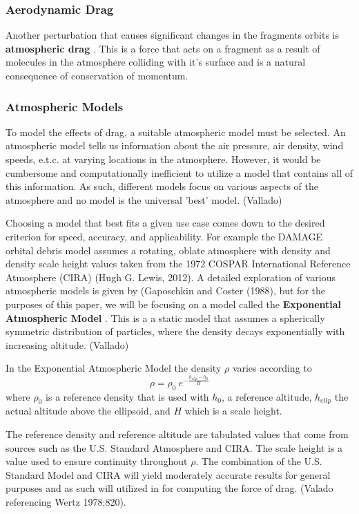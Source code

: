 \documentclass{article}
\newcommand{\boldindex}[1]{%
	\textbf{#1}\index{#1}%
}
\begin{document}
\subsubsection{Aerodynamic Drag}

Another perturbation that causes significant changes in the fragments orbits is \boldindex{atmospheric drag}. This is a force that acts on a fragment as a result of molecules in the atmosphere colliding with it's surface and is a natural consequence of conservation of momentum. 

\subsubsection{Atmospheric Models}

To model the effects of drag, a suitable atmospheric model must be selected. An atmospheric model tells us information about the air pressure, air density, wind speeds, e.t.c. at varying locations in the atmosphere. However, it would be cumbersome and computationally inefficient to utilize a model that contains all of this information. As such, different models focus on various aspects of the atmosphere and no model is the universal 'best' model. (Vallado)

Choosing a model that best fits a given use case comes down to the desired criterion for speed, accuracy, and applicability. For example the DAMAGE orbital debris model assumes a rotating, oblate atmosphere with density and density scale height values taken from the 1972 COSPAR International Reference Atmosphere (CIRA) (Hugh G. Lewis, 2012).  A detailed exploration of various atmospheric models is given by (Gaposchkin and Coster (1988), but for the purposes of this paper, we will be focusing on a model called the \boldindex{Exponential Atmospheric Model}. This is a  a static model that assumes a spherically symmetric distribution of particles, where the density decays exponentially with increasing altitude. (Vallado)

In the Exponential Atmospheric Model the density $\rho$ varies according to
\begin{equation}
	\rho = \rho_0\:e^{-\frac{h_{ellp} - h_0}{H}}
\end{equation}
where $\rho_0$ is a reference density that is used with $h_0$,  a reference altitude,  $h_{ellp}$ the actual altitude above the ellipsoid, and $H$ which is a scale height.

The reference density and reference altitude are tabulated values that come from sources such as the U.S. Standard Atmosphere and CIRA. The scale height is a value used to ensure continuity throughout $\rho$. The combination of the U.S. Standard Model and CIRA will yield moderately accurate results for general purposes and as such will utilized in for computing the force of drag. (Valado referencing Wertz 1978;820).
\end{document}
